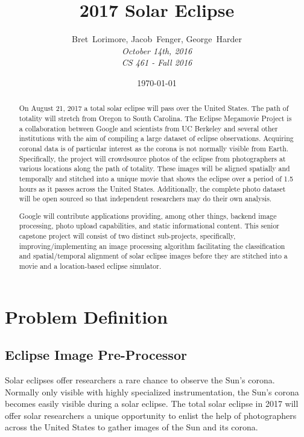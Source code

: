 \documentclass[10pt, onecolumn, draftclsnofoot, letterpaper]{IEEEtran}
\title{2017 Solar Eclipse}
\date{\today} %
\author{Bret~Lorimore, Jacob~Fenger, George~Harder \\
		\textit{October 14th, 2016 \\
		CS 461 - Fall 2016}}
\begin{document}
\maketitle

\begin{abstract}
On August 21, 2017 a total solar eclipse will pass over the United States. The
path of totality will stretch from Oregon to South Carolina. The Eclipse 
Megamovie Project is a collaboration between Google and scientists from UC 
Berkeley and several other institutions with the aim of compiling a large 
dataset of eclipse observations. Acquiring coronal data is of particular 
interest as the corona is not normally visible from Earth. Specifically, 
the project will crowdsource photos of the eclipse from photographers at 
various locations along the path of totality. These images will be aligned 
spatially and temporally and stitched into a unique movie that shows the 
eclipse over a period of 1.5 hours as it passes across the United States. 
Additionally, the complete photo dataset will be open sourced so that 
independent researchers may do their own analysis.

Google will contribute applications providing, among other things, backend 
image processing, photo upload capabilities, and static informational content. 
This senior capstone project will consist of two distinct sub-projects, 
specifically, improving/implementing an image processing algorithm facilitating 
the classification and spatial/temporal alignment of solar eclipse images before 
they are stitched into a movie and a location-based eclipse simulator.
\end{abstract}
\newpage %

\section{Problem Definition}

\subsection{Eclipse Image Pre-Processor}
Solar eclipses offer researchers a rare chance to observe the Sun's corona. 
Normally only visible with highly specialized instrumentation, the Sun's 
corona becomes easily visible during a solar eclipse. The total solar eclipse 
in 2017 will offer solar researchers a unique opportunity to enlist the help 
of photographers across the United States to gather images of the Sun and its 
corona.
\end{document}
